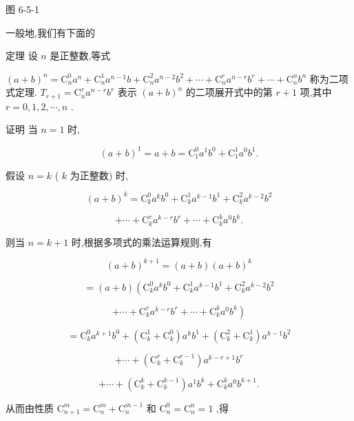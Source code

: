 \documentclass[10pt]{article}
\begin{document}
图 6-5-1

一般地,我们有下面的

定理 设 \(n\) 是正整数,等式

\({\left( a + b\right) }^{n} = {\mathrm{C}}_{n}^{0}{a}^{n} + {\mathrm{C}}_{n}^{1}{a}^{n - 1}b + {\mathrm{C}}_{n}^{2}{a}^{n - 2}{b}^{2} + \cdots  + {\mathrm{C}}_{n}^{r}{a}^{n - r}{b}^{r} + \cdots  + {\mathrm{C}}_{n}^{n}{b}^{n}\) 称为二项式定理. \({T}_{r + 1} = {\mathrm{C}}_{n}^{r}{a}^{n - r}{b}^{r}\) 表示 \({\left( a + b\right) }^{n}\) 的二项展开式中的第 \(r + 1\) 项,其中 \(r = 0,1,2,\cdots ,n\) .

证明 当 \(n = 1\) 时,

\[
{\left( a + b\right) }^{1} = a + b = {\mathrm{C}}_{1}^{0}{a}^{1}{b}^{0} + {\mathrm{C}}_{1}^{1}{a}^{0}{b}^{1}.
\]

假设 \(n = k\) ( \(k\) 为正整数) 时,

\[
{\left( a + b\right) }^{k} = {\mathrm{C}}_{k}^{0}{a}^{k}{b}^{0} + {\mathrm{C}}_{k}^{1}{a}^{k - 1}{b}^{1} + {\mathrm{C}}_{k}^{2}{a}^{k - 2}{b}^{2}
\]

\[
+ \cdots  + {\mathrm{C}}_{k}^{r}{a}^{k - r}{b}^{r} + \cdots  + {\mathrm{C}}_{k}^{k}{a}^{0}{b}^{k}.
\]

则当 \(n = k + 1\) 时,根据多项式的乘法运算规则,有

\[
{\left( a + b\right) }^{k + 1} = \left( {a + b}\right) {\left( a + b\right) }^{k}
\]

\[
= \left( {a + b}\right) \left( {{\mathrm{C}}_{k}^{0}{a}^{k}{b}^{0} + {\mathrm{C}}_{k}^{1}{a}^{k - 1}{b}^{1} + {\mathrm{C}}_{k}^{2}{a}^{k - 2}{b}^{2}}\right.
\]

\[
\left. {+\cdots  + {\mathrm{C}}_{k}^{r}{a}^{k - r}{b}^{r} + \cdots  + {\mathrm{C}}_{k}^{k}{a}^{0}{b}^{k}}\right)
\]

\[
= {\mathrm{C}}_{k}^{0}{a}^{k + 1}{b}^{0} + \left( {{\mathrm{C}}_{k}^{1} + {\mathrm{C}}_{k}^{0}}\right) {a}^{k}{b}^{1} + \left( {{\mathrm{C}}_{k}^{2} + {\mathrm{C}}_{k}^{1}}\right) {a}^{k - 1}{b}^{2}
\]

\[
+ \cdots  + \left( {{\mathrm{C}}_{k}^{r} + {\mathrm{C}}_{k}^{r - 1}}\right) {a}^{k - r + 1}{b}^{r}
\]

\[
+ \cdots  + \left( {{\mathrm{C}}_{k}^{k} + {\mathrm{C}}_{k}^{k - 1}}\right) {a}^{1}{b}^{k} + {\mathrm{C}}_{k}^{k}{a}^{0}{b}^{k + 1}.
\]

从而由性质 \({\mathrm{C}}_{n + 1}^{m} = {\mathrm{C}}_{n}^{m} + {\mathrm{C}}_{n}^{m - 1}\) 和 \({\mathrm{C}}_{n}^{0} = {\mathrm{C}}_{n}^{n} = 1\) ,得
\end{document}
